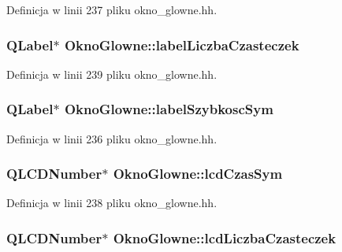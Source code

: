 Definicja w linii 237 pliku okno\+\_\+glowne.\+hh.

\hypertarget{class_okno_glowne_ab01460f1222d0ec2892abf21efb23078}{}
\subsubsection[{label\+Liczba\+Czasteczek}]{\setlength{\rightskip}{0pt plus 5cm}Q\+Label$\ast$ Okno\+Glowne\+::label\+Liczba\+Czasteczek}\label{class_okno_glowne_ab01460f1222d0ec2892abf21efb23078}


Definicja w linii 239 pliku okno\+\_\+glowne.\+hh.

\hypertarget{class_okno_glowne_ad7b0708ffdf61f3bef1349cc353a6c4e}{}
\subsubsection[{label\+Szybkosc\+Sym}]{\setlength{\rightskip}{0pt plus 5cm}Q\+Label$\ast$ Okno\+Glowne\+::label\+Szybkosc\+Sym}\label{class_okno_glowne_ad7b0708ffdf61f3bef1349cc353a6c4e}


Definicja w linii 236 pliku okno\+\_\+glowne.\+hh.

\hypertarget{class_okno_glowne_ab34fefe738e38b1b0d4ce764481cc0c6}{}
\subsubsection[{lcd\+Czas\+Sym}]{\setlength{\rightskip}{0pt plus 5cm}Q\+L\+C\+D\+Number$\ast$ Okno\+Glowne\+::lcd\+Czas\+Sym}\label{class_okno_glowne_ab34fefe738e38b1b0d4ce764481cc0c6}


Definicja w linii 238 pliku okno\+\_\+glowne.\+hh.

\hypertarget{class_okno_glowne_adbdd9fc009725804e015d267dc8375dc}{}
\subsubsection[{lcd\+Liczba\+Czasteczek}]{\setlength{\rightskip}{0pt plus 5cm}Q\+L\+C\+D\+Number$\ast$ Okno\+Glowne\+::lcd\+Liczba\+Czasteczek}\label{class_okno_glowne_adbdd9fc009725804e015d267dc8375dc}


